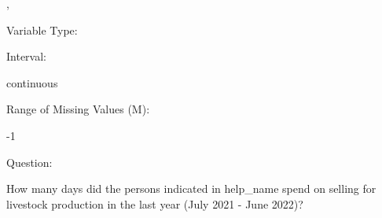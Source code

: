 \documentclass[
]{article}
\begin{document}
,

\begin{minipage}[t]{0.3\linewidth}

\colorbox{mypink1}{}

\end{minipage}%
\begin{minipage}[t]{0.7\linewidth}

\colorbox{mypink1}{\makebox[\textwidth]{\strut\bfseries\color{black}  
 }}

\end{minipage}

\begin{minipage}[t]{0.3\linewidth}

Variable Type:

\end{minipage}%
\begin{minipage}[t]{0.7\linewidth}

\end{minipage}

\begin{minipage}[t]{0.3\linewidth}

Interval:

\end{minipage}%
\begin{minipage}[t]{0.7\linewidth}

continuous

\end{minipage}

\begin{minipage}[t]{0.3\linewidth}

Range of Missing Values (M):

\end{minipage}%
\begin{minipage}[t]{0.7\linewidth}

-1

\end{minipage}

\begin{minipage}[t]{0.3\linewidth}

Question:

\end{minipage}%
\begin{minipage}[t]{0.7\linewidth}

How many days did the persons indicated in help\_name spend on selling
for livestock production in the last year (July 2021 - June 2022)?

\end{minipage}
\end{document}
